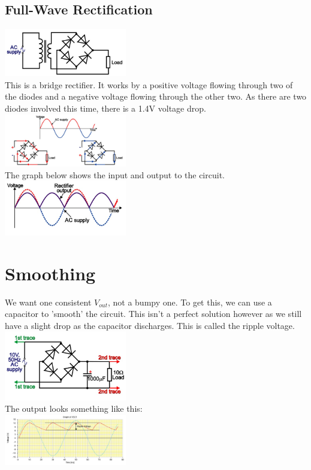 \documentclass[a4paper, 11pt, twocolumn]{article}
\begin{document}
\subsection{Full-Wave Rectification}
\includegraphics[width=0.4\textwidth]{bridgeCircuit.jpg}\\
This is a bridge rectifier. It works by a positive voltage flowing through two of the diodes and a negative voltage flowing through the other two. As there are two diodes involved this time, there is a 1.4V voltage drop. \\
\includegraphics[width=0.4\textwidth]{bridgeCircuitGraph1.jpg}\\
The graph below shows the input and output to the circuit.\\
\includegraphics[width=0.4\textwidth]{bridgeCircuitGraph2.jpg}\\

\section{Smoothing}
We want one consistent $V_{out}$, not a bumpy one. To get this, we can use a capacitor to 'smooth' the circuit. This isn't a perfect solution however as we still have a slight drop as the capacitor discharges. This is called the ripple voltage.\\
\includegraphics[width=0.4\textwidth]{smoothing1.jpg}\\
The output looks something like this:\\
\includegraphics[width=0.4\textwidth]{smoothing2.jpg}
\end{document}
